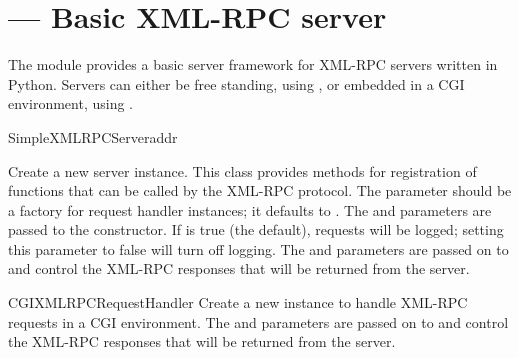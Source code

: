 \section{ ---
         Basic XML-RPC server}



The  module provides a basic server
framework for XML-RPC servers written in Python.  Servers can either
be free standing, using , or embedded in a
CGI environment, using .

\begin{classdesc}{SimpleXMLRPCServer}{addr}

  Create a new server instance.  This class
  provides methods for registration of functions that can be called by
  the XML-RPC protocol.  The  parameter
  should be a factory for request handler instances; it defaults to
  .  The  and
   parameters are passed to the
   constructor.  If
   is true (the default), requests will be logged;
  setting this parameter to false will turn off logging.  
  The  and  parameters are passed on to 
   and control the XML-RPC responses that will be returned 
  from the server.
\end{classdesc}

\begin{classdesc}{CGIXMLRPCRequestHandler}{}
  Create a new instance to handle XML-RPC requests in a CGI
  environment. 
  The  and  parameters are passed on to 
   and control the XML-RPC responses that will be returned 
  from the server.
\end{classdesc}

